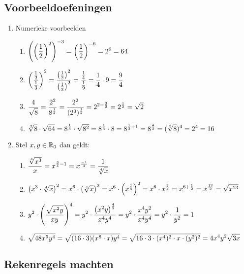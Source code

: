 \documentclass{ximera}
\begin{document}
\subsection{Voorbeeldoefeningen}
\begin{enumerate}
	\item Numerieke voorbeelden
	\begin{enumerate}
		\item $\displaystyle{\left(\left(\frac{1}{2}\right)^{2}\right)^{-3}=\left(\frac{1}{2}\right)^{-6}=2^{6}=64}$
		\item $\displaystyle{\left(\frac{\frac{1}{2}}{\frac{1}{3}}\right)^{2}=\frac{\left(\frac{1}{2}\right)^{2}}{\left(\frac{1}{3}\right)^{2}}=
			\frac{\frac{1}{4}}{\frac{1}{9}}=\frac{1}{4} \cdot 9=\frac{9}{4}}$
		\item $\displaystyle{\frac{4}{\sqrt{8}}=\frac{2^{2}}{8^{\frac{1}{2}}}=\frac{2^{2}}{(2^{3})^{\frac{1}{2}}}=2^{2-\frac{3}{2}}=
			2^{\frac{1}{2}}=\sqrt{2}}$
		\item
		$\displaystyle{\sqrt[3]{8} \cdot \sqrt{64}=8^{\frac{1}{3}}\cdot \sqrt{8^{2}}=8^{\frac{1}{3}}\cdot8=8^{\frac{1}{3}+1}=8^{\frac{4}{3}}=(\sqrt[3]{8})^4}=2^4=16$
	\end{enumerate}
	\pagebreak
	\item Stel $x,y \in \mathbb{R}_0$ dan geldt:
	\begin{enumerate}
		\item
		$\displaystyle{\frac{\sqrt[4]{x^{3}}}{x}=x^{\frac{3}{4}-1}=x^{\frac{-1}{4}}=\frac{1}{\sqrt[4]{x}}}$
		\item
		$\displaystyle{\left(x^{3}\cdot \sqrt[4]{x}\right)^{2}=x^{6}\cdot \left(\sqrt[4]{x}\right)^{2}=x^{6}\cdot \left(x^{\frac{1}{4}}\right)^{2}=x^{6}\cdot x^{\frac{2}{4}}=
			x^{6+\frac{1}{2}}=x^{\frac{13}{2}}=\sqrt{x^{13}}}$
		\item
		$\displaystyle{y^{2} \cdot \left(\frac{\sqrt{x^{2}y}}{xy}\right)^{4}=y^{2} \cdot \frac{\left(x^{2}y\right)^{\frac{4}{2}}}{x^{4}y^{4}}=y^{2}\cdot \frac{x^{4}y^{2}}{x^{4}y^{4}}
			=y^{2} \cdot \frac{1}{y^{2}}=1}$
		\item
		$\displaystyle{\sqrt{48 x^{9}y^{4}}=\sqrt{(16 \cdot 3)(x^{8} \cdot
				x)y^{4}}=\sqrt{16 \cdot 3\cdot (x^{4})^{2}\cdot x\cdot
				(y^{2})^{2}}=4 x^{4}y^{2}\sqrt{3x}}$
		
	\end{enumerate}
\end{enumerate}



\subsection{Rekenregels machten}\label{machtenrekenregels}
\end{document}
